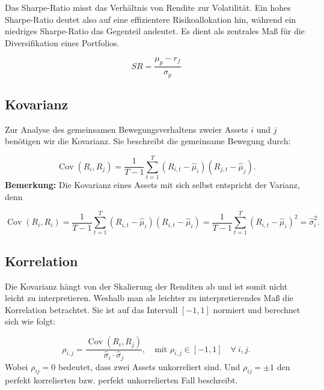 \documentclass[parskip=half]{scrartcl}
\begin{document}
	Das Sharpe-Ratio misst das Verhältnis von Rendite zur Volatilität. Ein hohes Sharpe-Ratio deutet also auf eine effizientere Risikoallokation hin, während ein niedriges Sharpe-Ratio das Gegenteil andeutet. Es dient als zentrales Maß für die Diversifikation eines Portfolios.
	
	\begin{equation}
		SR = \frac{\mu_p - r_f}{\sigma_p} \label{eq:sharpe_ratio}
	\end{equation}
	
	\clearpage
	
	\subsection{Kovarianz}
	Zur Analyse des gemeinsamen Bewegungsverhaltens zweier Assets $i$ und $j$ benötigen wir die Kovarianz. Sie beschreibt die gemeinsame Bewegung durch:
	
	\begin{equation}
		\operatorname{Cov}(R_i,R_j) = \frac{1}{T-1} \sum_{t=1}^{T} (R_{i,t} - \hat{\mu}_i)(R_{j,t} - \hat{\mu}_j). \label{eq:kovarianz}
	\end{equation}
	\textbf{Bemerkung:}
	Die Kovarianz eines Assets mit sich selbst entspricht der Varianz, denn
	
	\begin{equation}
		\operatorname{Cov}(R_i,R_i) = \frac{1}{T-1} \sum_{t=1}^{T} (R_{i,t} - \hat{\mu}_i)(R_{i,t} - \hat{\mu}_i) = \frac{1}{T-1} \sum_{t=1}^{T} (R_{i,t} - \hat{\mu}_i)^2 = \hat{\sigma}_i^2.
	\end{equation}
	
	\subsection{Korrelation}
	Die Kovarianz hängt von der Skalierung der Renditen ab und ist somit nicht leicht zu interpretieren. Weshalb man als leichter zu interpretierendes Maß die Korrelation betrachtet. Sie ist auf das Intervall $[-1,1]$ normiert und berechnet sich wie folgt:
	
	\begin{equation}
		\rho_{i,j} = \frac{\operatorname{Cov}(R_i,R_j)}{\hat{\sigma}_i \cdot \hat{\sigma}_j} , \quad \text{mit } \rho_{i,j} \in [-1,1] \quad \forall \ i,j. \label{eq:korrelation}
	\end{equation}
	Wobei $\rho_{ij} = 0$ bedeutet, dass zwei Assets unkorreliert sind. Und $\rho_{ij} = \pm 1$ den perfekt korrelierten bzw. perfekt unkorrelierten Fall beschreibt.
	
\end{document}
